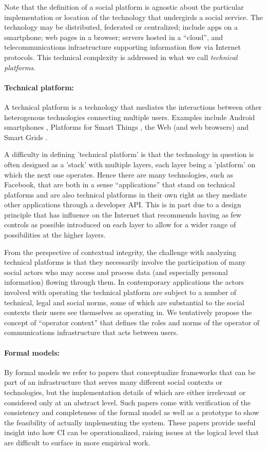 \documentclass[../thesis.tex]{subfiles}
\begin{document}
Note that the definition of a social platform is agnostic about the
particular implementation or location of the technology that undergirds
a social service. The technology may be distributed, federated or
centralized; include apps on a smartphone; web pages in a browser;
servers hosted in a ``cloud'', and
telecommunications infrastructure supporting information flow via
Internet protocols. This technical complexity is addressed in what we
call \textit{technical platforms}.


\paragraph{Technical platform:}
A technical platform is a technology that
mediates the interactions between other heterogenous technologies
connecting multiple users. Examples include Android smartphones
\cite{wijesekera2015android},
Platforms for Smart Things \cite{jia2017contexiot},
the Web (and web browsers)
and Smart Grids \cite{salehie2012adaptive}.

A difficulty in defining 'technical
platform' is that the technology in question is often
designed as a 'stack' with multiple
layers, each layer being a 'platform'
on which the next one operates.
Hence there are many technologies, such
as Facebook, that are both in a sense
``applications'' that stand on technical
platforms and are also technical platforms in their
own right as they
mediate other applications through a developer API.
This is in part due
to a design principle that has influence on the
Internet \cite{clark2002tussle} that recommends having as few controls as possible
introduced on
each layer to allow for a wider range of possibilities at
the higher
layers.

From the perspective of contextual integrity, the challenge with
analyzing technical platforms is that they necessarily involve the
participation of many social actors who may access and process data
(and especially personal information) flowing through them. In
contemporary applications the actors involved with operating the
technical platform are subject to a number of technical, legal and
social norms, some of which are substantial to the social contexts
their users see themselves as operating in. We tentatively propose the
concept of ``operator context'' that defines
the roles and norms of the operator of communications infrastructure
that acts between users. 

\paragraph{Formal models:} By formal models we refer to papers that
conceptualize frameworks that can be part of an infrastructure that
serves many different social contexts or technologies, but the
implementation details of which are either irrelevant or considered
only at an abstract level. Such papers come with verification of the
consistency and completeness of the formal model as well as a prototype
to show the feasibility of actually implementing the system. These
papers provide useful insight into how CI can be operationalized,
raising issues at the logical level that are difficult to surface in
more empirical work.
\end{document}
